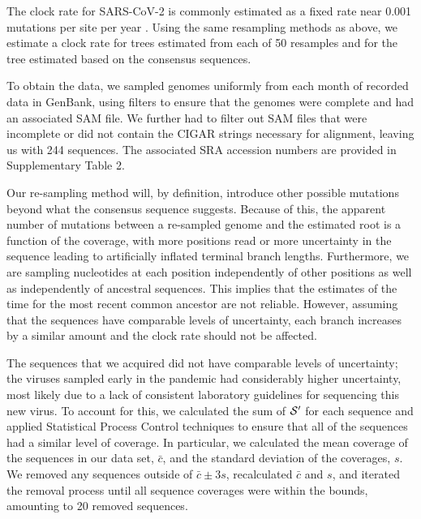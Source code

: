 \documentclass[12pt]{article}
\begin{document}
The clock rate for SARS-CoV-2 is commonly estimated as a fixed rate near 0.001 mutations per site per year \cite{ducheneTemporalSignalPhylodynamic2020, choudharySevereAcuteRespiratory2021, songGenomicEpidemiologySARSCoV22021, niePhylogeneticPhylodynamicAnalyses2020, geidelbergGenomicEpidemiologyDensely2021}.
Using the same resampling methods as above, we estimate a clock rate for trees estimated from each of 50 resamples and for the tree estimated based on the consensus sequences.

To obtain the data, we sampled genomes uniformly from each month of recorded data in GenBank, using filters to ensure that the genomes were complete and had an associated SAM file.
We further had to filter out SAM files that were incomplete or did not contain the CIGAR strings necessary for alignment, leaving us with 244 sequences.
The associated SRA accession numbers are provided in Supplementary Table 2.

Our re-sampling method will, by definition, introduce other possible mutations beyond what the consensus sequence suggests.
Because of this, the apparent number of mutations between a re-sampled genome and the estimated root is a function of the coverage, with more positions read or more uncertainty in the sequence leading to artificially inflated terminal branch lengths.
Furthermore, we are sampling nucleotides at each position independently of other positions as well as independently of ancestral sequences.
This implies that the estimates of the time for the most recent common ancestor are not reliable.
However, assuming that the sequences have comparable levels of uncertainty, each branch increases by a similar amount and the clock rate should not be affected.

The sequences that we acquired did not have comparable levels of uncertainty; the viruses sampled early in the pandemic had considerably higher uncertainty, most likely due to a lack of consistent laboratory guidelines for sequencing this new virus.
To account for this, we calculated the sum of $\mathcal{S}'$ for each sequence and applied Statistical Process Control techniques to ensure that all of the sequences had a similar level of coverage.
In particular, we calculated the mean coverage of the sequences in our data set, $\bar c$, and the standard deviation of the coverages, $s$.
We removed any sequences outside of $\bar c \pm 3 s$, recalculated $\bar c$ and $s$, and iterated the removal process until all sequence coverages were within the bounds, amounting to 20 removed sequences.
\end{document}
